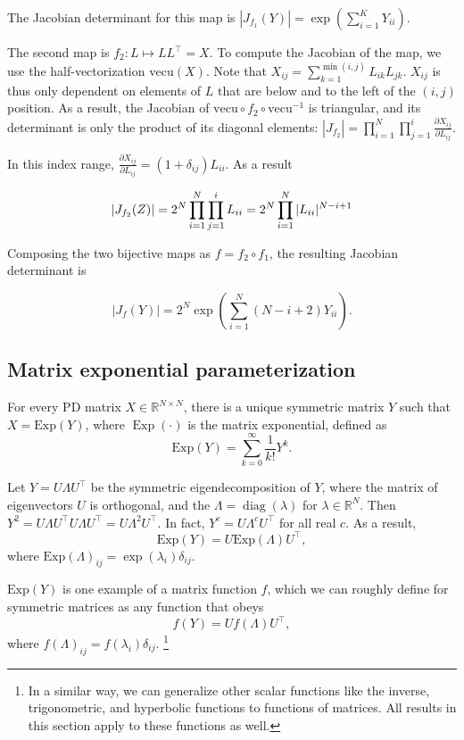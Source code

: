 \documentclass[11pt]{article}
\newcommand{\abs}[1]{\left| #1 \right|}
\newcommand{\absdet}[1]{\abs{#1}}
\newcommand{\Exp}{\mathrm{Exp}}
\newcommand{\vectu}{\mathrm{vecu}}
\begin{document}
The Jacobian determinant for this map is $\absdet{J_{f_1}(Y)} = \exp(\sum_{i=1}^K Y_{ii})$.

The second map is $f_2: L \mapsto L L^\top = X$.
To compute the Jacobian of the map, we use the half-vectorization $\vectu(X)$.
Note that $X_{ij} = \sum_{k=1}^{\min(i, j)} L_{ik} L_{jk}$.
$X_{ij}$ is thus only dependent on elements of $L$ that are below and to the left of the $(i, j)$ position.
As a result, the Jacobian of $\vectu \circ f_2 \circ \vectu^{-1}$ is triangular, and its determinant is only the product of its diagonal elements: $\absdet{J_{f_2}} = \prod_{i=1}^N \prod_{j=1}^i \frac{\partial X_{ij}}{\partial L_{ij}}$.

In this index range, $\frac{\partial X_{ij}}{\partial L_{ij}} = (1 + \delta_{ij}) L_{ii}$.
As a result

\[
  \absdet{J_{f_2}(Z)} = 2^N \prod_{i = 1}^N \prod_{j = 1}^i L_{ii} = 2^N \prod_{i=1}^N |L_{ii}|^{N - i + 1} \\
\]

Composing the two bijective maps as $f = f_2 \circ f_1$, the resulting Jacobian determinant is

\[
  \absdet{J_{f}(Y)} = 2^N \exp\left( \sum_{i=1}^N (N - i + 2) Y_{ii}\right).
\]

\subsection{Matrix exponential parameterization}

For every PD matrix $X \in \mathbb{R}^{N \times N}$, there is a unique symmetric matrix $Y$ such that $X = \Exp(Y)$, where $\operatorname{Exp}(\cdot)$ is the matrix exponential, defined as
\[\Exp(Y) = \sum_{k=0}^\infty \frac{1}{k!} Y^k.\]

Let $Y = U \Lambda U^\top$ be the symmetric eigendecomposition of $Y$, where the matrix of eigenvectors $U$ is orthogonal, and the $\Lambda = \operatorname{diag}(\lambda)$ for $\lambda \in \mathbb{R}^N$.
Then $Y^2 = U \Lambda U^\top U \Lambda U^\top = U \Lambda^2 U^\top$.
In fact, $Y^c = U \Lambda^c U^\top$ for all real $c$.
As a result,
\[\Exp(Y) = U \Exp(\Lambda) U^\top,\]
where $\Exp(\Lambda)_{ij} = \exp(\lambda_i) \delta_{ij}$.

$\Exp(Y)$ is one example of a matrix function $f$, which we can roughly define for symmetric matrices as any function that obeys
\[f(Y) = U f(\Lambda) U^\top,\]
where $f(\Lambda)_{ij} = f(\lambda_i)\delta_{ij}$.
\footnote{
  In a similar way, we can generalize other scalar functions like the inverse, trigonometric, and hyperbolic functions to functions of matrices.
  All results in this section apply to these functions as well.
}
\end{document}
